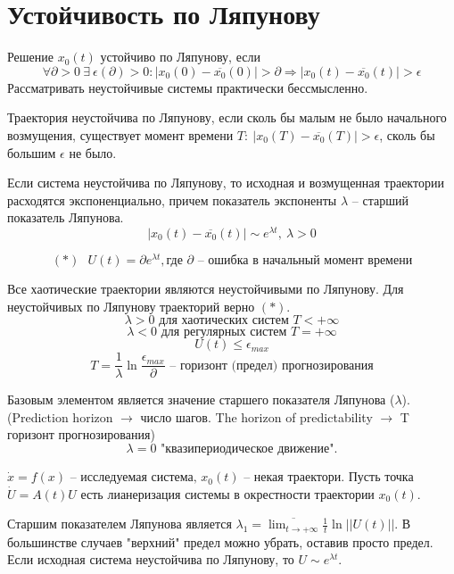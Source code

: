 \documentclass[11pt]{article}
\begin{document}
	\section{Устойчивость по Ляпунову}
	
	Решение $x_0(t)$ устойчиво по Ляпунову, если $$ \forall \partial>0 \:\exists\: \epsilon(\partial)>0:|x_0(0)-\overline{x_0}(0)|>\partial \Rightarrow |x_0(t)-\overline{x_0}(t)|>\epsilon $$
	Рассматривать неустойчивые системы практически бессмысленно.
	
	Траектория неустойчива по Ляпунову, если сколь бы малым не было начального возмущения, существует момент времени $T:\:|x_0(T)-\overline{x_0}(T)|>\epsilon$, сколь бы большим $\epsilon$ не было.
	
	Если система неустойчива по Ляпунову, то исходная и возмущенная траектории расходятся экспоненциально, причем показатель экспоненты $\lambda$ -- старший показатель Ляпунова.
	$$ |x_0(t)-\overline{x_0}(t)|\sim e^{\lambda t},\:\lambda>0 $$
	
	$$ (*)\:\:\: U(t)=\partial e^{\lambda t}, \text{где } \partial \text{ -- ошибка в начальный момент времени}$$
	
	Все хаотические траектории являются неустойчивыми по Ляпунову. Для неустойчивых по Ляпунову траекторий верно $(*)$.
	$$ \lambda>0 \text{ для хаотических систем } T<+\infty $$
	$$ \lambda<0 \text{ для регулярных систем } T=+\infty $$
	$$ U(t)\le \epsilon_{max} $$
	$$ T=\frac{1}{\lambda}\ln \frac{\epsilon_{max}}{\partial} \text{ -- горизонт (предел) прогнозирования}$$
	
	Базовым элементом является значение старшего показателя Ляпунова ($\lambda$). (Prediction horizon $\rightarrow$ число шагов. The horizon of predictability $\rightarrow$ T горизонт прогнозирования)
	$$\lambda = 0 \text{ "квазипериодическое движение".}$$
	
	$ \dot x = f(x) \text{ -- исследуемая система, } x_0(t) \text{ -- некая траектори} $. Пусть точка $\dot U = A(t)U$ есть лианеризация системы в окрестности траектории $x_0(t)$.
	
	Старшим показателем Ляпунова является $\lambda_1 = \overline{\lim_{t\to + \infty}}\frac{1}{t} \ln || U(t)|| $. В большинстве случаев "верхний" предел можно убрать, оставив просто предел. Если исходная система неустойчива по Ляпунову, то $U\sim e^{\lambda t}$.
	
\end{document}
